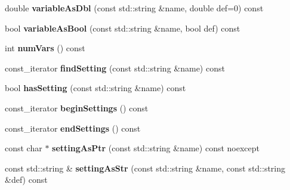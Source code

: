 \begin{DoxyCompactItemize}
\item 
\mbox{\label{classtheoria_1_1util_1_1CommandLine_a42fbe66f3bcf121ad631df39d09606ef}} 
double {\bfseries variable\+As\+Dbl} (const std\+::string \&name, double def=0) const
\item 
\mbox{\label{classtheoria_1_1util_1_1CommandLine_a6d4d9be7adcf9ac15a1e5469535e97e9}} 
bool {\bfseries variable\+As\+Bool} (const std\+::string \&name, bool def) const
\item 
\mbox{\label{classtheoria_1_1util_1_1CommandLine_abe3bbdaa5b4abb7bf86996304b451253}} 
int {\bfseries num\+Vars} () const
\item 
\mbox{\label{classtheoria_1_1util_1_1CommandLine_abb86432416368ace970920f3fc4fe9c6}} 
const\+\_\+iterator {\bfseries find\+Setting} (const std\+::string \&name) const
\item 
\mbox{\label{classtheoria_1_1util_1_1CommandLine_a011dfbb3035341128a4e4e4f4a466cff}} 
bool {\bfseries has\+Setting} (const std\+::string \&name) const
\item 
\mbox{\label{classtheoria_1_1util_1_1CommandLine_ae0758c3259074eddfc06c4a77ac3a1a9}} 
const\+\_\+iterator {\bfseries begin\+Settings} () const
\item 
\mbox{\label{classtheoria_1_1util_1_1CommandLine_ae33c86c2a60d2470827b2206893c8f7b}} 
const\+\_\+iterator {\bfseries end\+Settings} () const
\item 
\mbox{\label{classtheoria_1_1util_1_1CommandLine_ad5b4089e23a04d31c3edcf3d659ab8d9}} 
const char $\ast$ {\bfseries setting\+As\+Ptr} (const std\+::string \&name) const noexcept
\item 
\mbox{\label{classtheoria_1_1util_1_1CommandLine_ac398ce852930a3974f9ed6a1c5255975}} 
const std\+::string \& {\bfseries setting\+As\+Str} (const std\+::string \&name, const std\+::string \&def) const

\end{DoxyCompactItemize}

